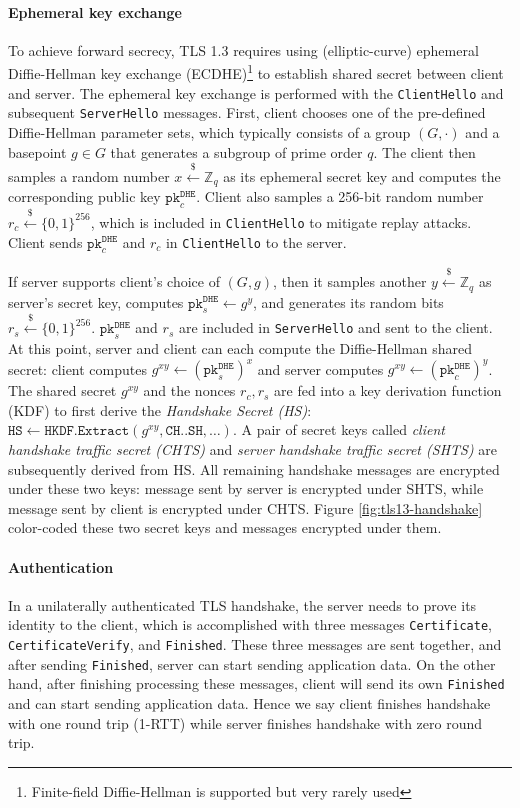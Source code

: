 \documentclass[letterpaper,12pt,titlepage,oneside,final]{book}
\newcommand{\pk}{\texttt{pk}}
\newcommand{\leftsample}{\stackrel{\$}{\leftarrow}}
\newcommand{\dhe}{{\texttt{DHE}}}
\begin{document}
\paragraph{Ephemeral key exchange} To achieve forward secrecy, TLS 1.3 requires using (elliptic-curve) ephemeral Diffie-Hellman key exchange (ECDHE)\footnote{Finite-field Diffie-Hellman is supported but very rarely used} to establish shared secret between client and server.
The ephemeral key exchange is performed with the \texttt{ClientHello} and subsequent \texttt{ServerHello} messages.
First, client chooses one of the pre-defined Diffie-Hellman parameter sets, which typically consists of a group $(G, \cdot)$ and a basepoint $g\in G$ that generates a subgroup of prime order $q$.
The client then samples a random number $x \leftsample \mathbb{Z}_q$ as its ephemeral secret key and computes the corresponding public key $\pk^\dhe_c$.
Client also samples a 256-bit random number $r_c \leftsample \{0,1\}^{256}$, which is included in \texttt{ClientHello} to mitigate replay attacks.
Client sends $\pk^\dhe_c$ and $r_c$ in \texttt{ClientHello} to the server.

If server supports client's choice of $(G, g)$, then it samples another $y \leftsample \mathbb{Z}_q$ as server's secret key, computes $\pk^\dhe_s\leftarrow g^y$, and generates its random bits $r_s \leftsample \{0,1\}^{256}$. $\pk^\dhe_s$ and $r_s$ are included in \texttt{ServerHello} and sent to the client. 
At this point, server and client can each compute the Diffie-Hellman shared secret: client computes $g^{xy}\leftarrow (\pk^\dhe_s)^x$ and server computes $g^{xy}\leftarrow (\pk^\dhe_c)^y$.
The shared secret $g^{xy}$ and the nonces $r_c, r_s$ are fed into a key derivation function (KDF) to first derive the \emph{Handshake Secret (HS)}: $\texttt{HS} \leftarrow \texttt{HKDF.Extract}(g^{xy}, \texttt{CH..SH}, \ldots)$.
A pair of secret keys called \emph{client handshake traffic secret (CHTS)} and \emph{server handshake traffic secret (SHTS)} are subsequently derived from HS.
All remaining handshake messages are encrypted under these two keys: message sent by server is encrypted under SHTS, while message sent by client is encrypted under CHTS.
Figure \ref{fig:tls13-handshake} color-coded these two secret keys and messages encrypted under them.

\paragraph{Authentication} In a unilaterally authenticated TLS handshake, the server needs to prove its identity to the client, which is accomplished with three messages \texttt{Certificate}, \texttt{CertificateVerify}, and \texttt{Finished}.
These three messages are sent together, and after sending \texttt{Finished}, server can start sending application data.
On the other hand, after finishing processing these messages, client will send its own \texttt{Finished} and can start sending application data.
Hence we say client finishes handshake with one round trip (1-RTT) while server finishes handshake with zero round trip.
\end{document}
